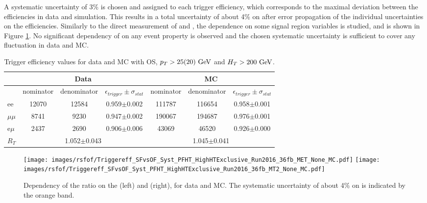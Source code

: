 A systematic uncertainty of 3\% is chosen and assigned to each trigger efficiency, which corresponds to the maximal deviation between the efficiencies in data and simulation.
This results in a total uncertainty of about 4\% on \RT after error propagation of the individual uncertainties on the efficiencies.
Similarly to the direct measurement of \Rsfof and \rmue, the dependence on some signal region variables is studied, and is shown in Figure \ref{fig:EffDependency}. 
No significant dependency of \RT on any event property is observed and the chosen systematic uncertainty is sufficient to cover any fluctuation in data and MC. 
\begin{table}[ht!]
\def\arraystretch{1.2}
\setlength{\belowcaptionskip}{6pt} 
\small                            
\centering                           
\caption{Trigger efficiency values for data and MC with OS, $p_T>25(20)\,\,\text{Ge\hspace{-.08em}V}$ and $H_T>200\,\,\text{Ge\hspace{-.08em}V}$.} 
\label{tab:TriggerEffValues}
\begin{tabular}{l c c c |c c c}  
\hline \hline
&\multicolumn{3}{c|}{Data} &\multicolumn{3}{c}{MC} \\\hline
& nominator & denominator & $\epsilon_{trigger} \pm \sigma_{stat}$ & nominator & denominator & $\epsilon_{trigger} \pm \sigma_{stat}$ \\    \hline
ee & 12070 & 12584 & 0.959$\pm$0.002 & 111787 & 116654 & 0.958$\pm$0.001 \\
$\mu\mu$ & 8741 & 9230 & 0.947$\pm$0.002 & 190067 & 194687 & 0.976$\pm$0.001 \\
e$\mu$ & 2437 & 2690 & 0.906$\pm$0.006 & 43069 & 46520 & 0.926$\pm$0.000 \\
\hline
$R_{T}$ & \multicolumn{3}{c|}{1.052$\pm$0.043}  & \multicolumn{3}{c}{1.045$\pm$0.041}  \\\hline\hline
\end{tabular}
\end{table}                                                                                                                                           
\begin{figure}[htbp!]
\begin{center}
    \texttt{[image: images/rsfof/Triggereff\_SFvsOF\_Syst\_PFHT\_HighHTExclusive\_Run2016\_36fb\_MET\_None\_MC.pdf]}
    \texttt{[image: images/rsfof/Triggereff\_SFvsOF\_Syst\_PFHT\_HighHTExclusive\_Run2016\_36fb\_MT2\_None\_MC.pdf]}
    \caption{Dependency of the \RT ratio on the \ptmiss (left) and \mttwo (right), for data and MC. The systematic uncertainty of about 4\% on \RT is indicated by the orange band.}
\label{fig:EffDependency}
\end{center}
\end{figure}                                                                                                                                                                              
